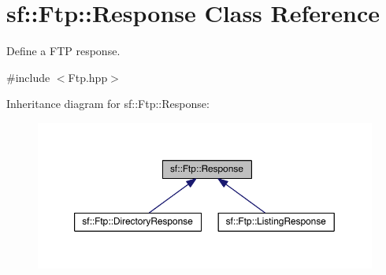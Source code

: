 \hypertarget{classsf_1_1_ftp_1_1_response}{\section{sf\-:\-:Ftp\-:\-:Response Class Reference}
\label{classsf_1_1_ftp_1_1_response}
}


Define a F\-T\-P response.  




{\ttfamily \#include $<$Ftp.\-hpp$>$}



Inheritance diagram for sf\-:\-:Ftp\-:\-:Response\-:
\nopagebreak
\begin{figure}[H]
\begin{center}
\leavevmode
\includegraphics[width=350pt]{classsf_1_1_ftp_1_1_response__inherit__graph}
\end{center}
\end{figure}
